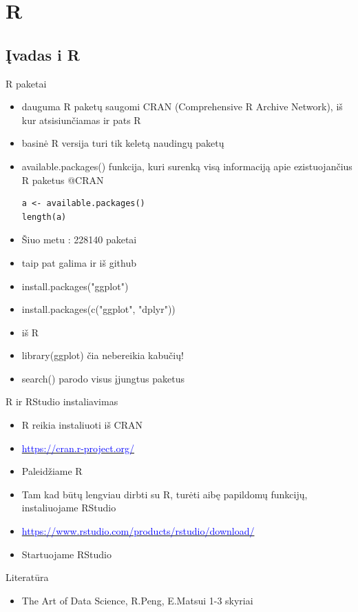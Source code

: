 \documentclass[11pt,xcolor=table]{beamer}
\begin{document}
\section{R}

\subsection{Įvadas i R}

\begin{frame}[fragile]{R paketai}
\begin{itemize}
\item dauguma R paketų saugomi CRAN (Comprehensive R Archive Network), iš kur atsisiunčiamas ir pats R
\item basinė R versija turi tik keletą naudingų paketų
\item available.packages() funkcija, kuri surenką visą informaciją apie ezistuojančius R paketus @CRAN
\begin{lstlisting}
a <- available.packages()
length(a)
\end{lstlisting}
\item Šiuo metu : 228140 paketai
\item taip pat galima ir iš github
\item install.packages("ggplot")
\item  install.packages(c("ggplot", "dplyr"))
\item iš R 
\item library(ggplot) čia nebereikia kabučių!
\item search() parodo visus įjungtus paketus
\end{itemize}
\end{frame}
\begin{frame}{R ir RStudio instaliavimas}
\begin{itemize}
\item R reikia instaliuoti iš CRAN
\item \href{https://cran.r-project.org/}{\textcolor{blue}{https://cran.r-project.org/}}
\item Paleidžiame R 
\item Tam kad būtų lengviau dirbti su R, turėti aibę papildomų funkcijų, instaliuojame RStudio
\item \href{https://www.rstudio.com/products/rstudio/download/}{\textcolor{blue}{https://www.rstudio.com/products/rstudio/download/}}
\item Startuojame RStudio
\end{itemize}
\end{frame}
\begin{frame}{Literatūra}
\begin{itemize}
\item The Art of Data Science, R.Peng, E.Matsui 1-3 skyriai
\end{itemize}
\end{frame}


\end{document}
